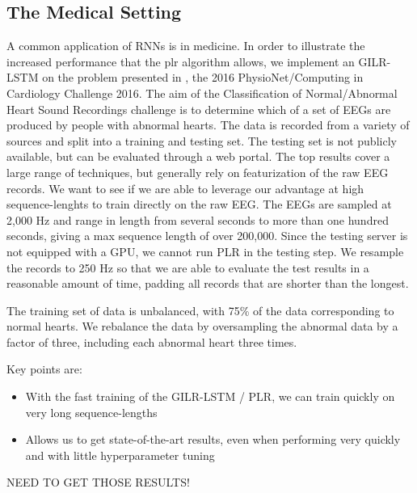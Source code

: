 \documentclass{article}
\begin{document}
\subsection{The Medical Setting}
A common application of RNNs is in medicine. In order to illustrate the
increased performance that the plr algorithm allows, we implement an GILR-LSTM
on the problem presented in , the 2016 PhysioNet/Computing in
Cardiology Challenge 2016.  The aim of the Classification of Normal/Abnormal
Heart Sound Recordings challenge is to determine which of a set of EEGs are
produced by people with abnormal hearts.  The data is recorded from a variety of
sources and split into a training and testing set. The testing set is not
publicly available, but can be evaluated through a web portal. The top results
cover a large range of techniques, but generally rely on featurization of the
raw EEG records. We want to see if we are able to leverage our advantage at high
sequence-lenghts to train directly on the raw EEG. The EEGs are sampled at 2,000
Hz and range in length from several seconds to more than one hundred seconds,
giving a max sequence length of over 200,000. Since the testing server is not
equipped with a GPU, we cannot run PLR in the testing step. We resample the
records to 250 Hz so that we are able to evaluate the test results in a
reasonable amount of time, padding all records that are shorter than the longest.


The training set of data is unbalanced, with 75\% of the data corresponding to
normal hearts. We rebalance the data by oversampling the abnormal data by a factor
of three, including each abnormal heart three times. 

Key points are:
\begin{itemize}
\item{With the fast training of the GILR-LSTM / PLR, we can train quickly on very
    long sequence-lengths}
\item{Allows us to get state-of-the-art results, even when performing very quickly
    and with little hyperparameter tuning}
\end{itemize}

NEED TO GET THOSE RESULTS!

  
\end{document}
